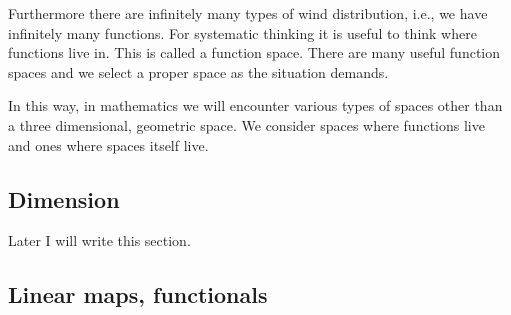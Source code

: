 \documentclass[openany, a4paper, oneside]{jsbook}
\theoremstyle{break}
\theoremstyle{breakdefn}
\begin{document}
Furthermore there are infinitely many types of wind distribution,
i.e., we have infinitely many functions.
For systematic thinking it is useful to think where functions live in.
This is called a function space.
There are many useful function spaces and we select a proper space as the situation demands.

In this way, in mathematics we will encounter various types of spaces
other than a three dimensional, geometric space.
We consider spaces where functions live and ones where spaces itself live.
\subsection{Dimension}


Later I will write this section.
\subsection{Linear maps, functionals}
\end{document}
